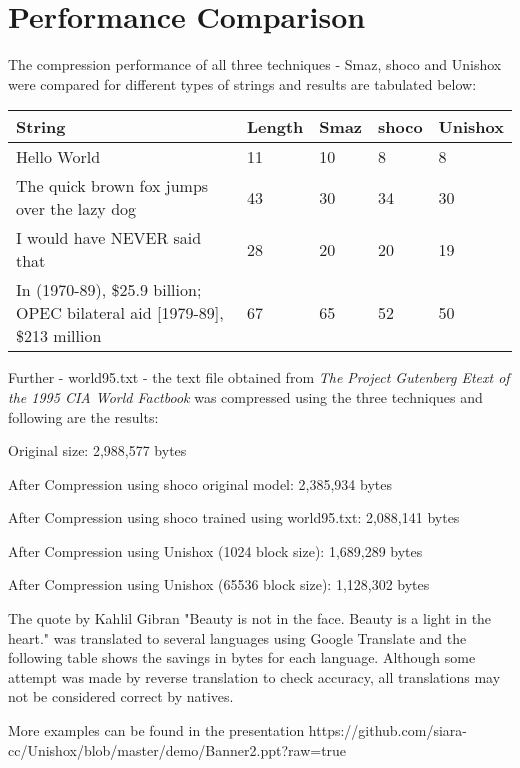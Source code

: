 \documentclass[]{article}
\begin{document}
\section{Performance Comparison}

The compression performance of all three techniques - Smaz, shoco and Unishox were compared for different types of strings and results are tabulated below:

\begin{center}
\begin{tabular}{ | p{} | p{} | p{} | p{} | p{} |} \hline
\textbf{String} & \textbf{Length} & \textbf{Smaz} & \textbf{shoco} & \textbf{Unishox} \\ \hline
Hello World & 11 & 10 & 8 & 8 \\ \hline
The quick brown fox jumps over the lazy dog & 43 & 30 & 34 & 30 \\ \hline
I would have NEVER said that & 28 & 20 & 20 & 19 \\ \hline
In (1970-89), \$25.9 billion; OPEC bilateral aid [1979-89], \$213 million & 67 & 65 & 52 & 50 \\ \hline
	\end{tabular}
\end{center}

Further - world95.txt - the text file obtained from \emph{The Project Gutenberg Etext of the 1995 CIA World Factbook} was compressed using the three techniques and following are the results:

Original size: 2,988,577 bytes

After Compression using shoco original model: 2,385,934 bytes

After Compression using shoco trained using world95.txt: 2,088,141 bytes

After Compression using Unishox (1024 block size): 1,689,289 bytes

After Compression using Unishox (65536 block size): 1,128,302 bytes

The quote by Kahlil Gibran "Beauty is not in the face. Beauty is a light in the heart." was translated to several languages using Google Translate and the following table shows the savings in bytes for each language.  Although some attempt was made by reverse translation to check accuracy, all translations may not be considered correct by natives.

More examples can be found in the presentation https://github.com/siara-cc/Unishox/blob/master/demo/Banner2.ppt?raw=true
\end{document}
